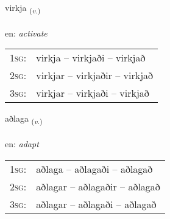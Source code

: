 \documentclass[frontgrid, backgrid]{flacards}\usepackage[]{graphicx}\usepackage[]{xcolor}
\begin{document}
\renewcommand{\blhead}{\vskip5pt {\small\bfseries\footnotesize Sagnorð | Verb }}
\renewcommand{\bcfoot}{\vskip5pt \hspace{2pt}{\small\bfseries\footnotesize 3K}}


{virkja \small{\textsubscript{(\textit{v.})}} \\[1ex] %
\textphonetic{[vɪr̥ca]} \\
en: \emph{activate} \\  [2ex]
\renewcommand*{\arraystretch}{0.8}
\begin{tabular}{p{1cm}l}
\textsc{1sg}: & virkja -- virkjaði -- virkjað \\ 
\textsc{2sg}: & virkjar -- virkjaðir -- virkjað \\ 
\textsc{3sg}: & virkjar -- virkjaði -- virkjað \\ 
\end{tabular}
}

\renewcommand{\flhead}{\vskip5pt \fboxsep=0pt {\small\bfseries\footnotesize Sagnorð | Verb}}
\renewcommand{\fcfoot}{\vskip5pt \fboxsep=0pt \hspace{2pt}{\small\bfseries\footnotesize 3K}}

\renewcommand{\blhead}{\vskip5pt {\small\bfseries\footnotesize Sagnorð | Verb }}
\renewcommand{\bcfoot}{\vskip5pt \hspace{2pt}{\small\bfseries\footnotesize 3K}}


{aðlaga \small{\textsubscript{(\textit{v.})}} \\[1ex] %
\textphonetic{[aðlaɣa]} \\
en: \emph{adapt} \\  [2ex]
\renewcommand*{\arraystretch}{0.8}
\begin{tabular}{p{1cm}l}
\textsc{1sg}: & aðlaga -- aðlagaði -- aðlagað \\ 
\textsc{2sg}: & aðlagar -- aðlagaðir -- aðlagað \\ 
\textsc{3sg}: & aðlagar -- aðlagaði -- aðlagað \\ 
\end{tabular}
}
\end{document}
